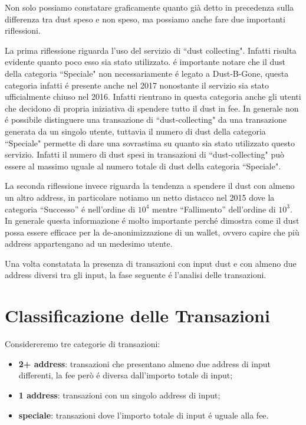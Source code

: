 Non solo possiamo constatare graficamente quanto già detto in precedenza sulla differenza tra dust speso e non speso, ma possiamo anche fare due importanti riflessioni. 

La prima riflessione riguarda l'uso del servizio di ``dust collecting". Infatti risulta evidente quanto poco esso sia stato utilizzato. é importante notare che il dust della categoria ``Speciale" non necessariamente é legato a Dust-B-Gone, questa categoria infatti é presente anche nel 2017 nonostante il servizio sia stato ufficialmente chiuso nel 2016. Infatti rientrano in questa categoria anche gli utenti che decidono di propria iniziativa di spendere tutto il dust in fee. In generale non é possibile distinguere una transazione di ``dust-collecting" da una transazione generata da un singolo utente, tuttavia il numero di dust della categoria ``Speciale" permette di dare una sovrastima su quanto sia stato utilizzato questo servizio. Infatti il numero di dust spesi in transazioni di ``dust-collecting" può essere al massimo uguale al numero totale di dust della categoria ``Speciale".  

La seconda riflessione invece riguarda la tendenza a spendere il dust con almeno un altro address, in particolare notiamo un netto distacco nel 2015 dove la categoria ``Successo'' é nell’ordine di $10^4$ mentre ``Fallimento'' dell’ordine di $10^3$. In generale questa informazione é molto importante perché dimostra come il dust possa essere efficace per la de-anonimizzazione di un wallet, ovvero capire che più address appartengano ad un medesimo utente.

Una volta constatata la presenza di transazioni con input dust e con almeno due address diversi tra gli input, la fase seguente é l'analisi delle transazioni.

\section{Classificazione delle Transazioni}
Considereremo tre categorie di transazioni: 
\begin{itemize}
    \item \textbf{2+ address}: transazioni che presentano almeno due address di input differenti, la fee però é diversa dall'importo totale di input;
    \item \textbf{1 address}: transazioni con un singolo address di input;
    \item \textbf{speciale}: transazioni dove l'importo totale di input é uguale alla fee.
\end{itemize}

